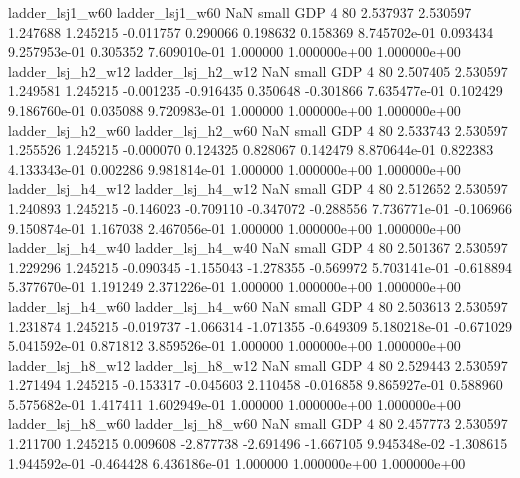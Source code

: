          ladder_lsj1_w60          ladder_lsj1_w60                   NaN      small      GDP                 4 80 2.537937       2.530597 1.247688       1.245215   -0.011757      0.290066      0.198632     0.158369   8.745702e-01  0.093434 9.257953e-01     0.305352   7.609010e-01            1.000000    1.000000e+00        1.000000e+00
       ladder_lsj_h2_w12        ladder_lsj_h2_w12                   NaN      small      GDP                 4 80 2.507405       2.530597 1.249581       1.245215   -0.001235     -0.916435      0.350648    -0.301866   7.635477e-01  0.102429 9.186760e-01     0.035088   9.720983e-01            1.000000    1.000000e+00        1.000000e+00
       ladder_lsj_h2_w60        ladder_lsj_h2_w60                   NaN      small      GDP                 4 80 2.533743       2.530597 1.255526       1.245215   -0.000070      0.124325      0.828067     0.142479   8.870644e-01  0.822383 4.133343e-01     0.002286   9.981814e-01            1.000000    1.000000e+00        1.000000e+00
       ladder_lsj_h4_w12        ladder_lsj_h4_w12                   NaN      small      GDP                 4 80 2.512652       2.530597 1.240893       1.245215   -0.146023     -0.709110     -0.347072    -0.288556   7.736771e-01 -0.106966 9.150874e-01     1.167038   2.467056e-01            1.000000    1.000000e+00        1.000000e+00
       ladder_lsj_h4_w40        ladder_lsj_h4_w40                   NaN      small      GDP                 4 80 2.501367       2.530597 1.229296       1.245215   -0.090345     -1.155043     -1.278355    -0.569972   5.703141e-01 -0.618894 5.377670e-01     1.191249   2.371226e-01            1.000000    1.000000e+00        1.000000e+00
       ladder_lsj_h4_w60        ladder_lsj_h4_w60                   NaN      small      GDP                 4 80 2.503613       2.530597 1.231874       1.245215   -0.019737     -1.066314     -1.071355    -0.649309   5.180218e-01 -0.671029 5.041592e-01     0.871812   3.859526e-01            1.000000    1.000000e+00        1.000000e+00
       ladder_lsj_h8_w12        ladder_lsj_h8_w12                   NaN      small      GDP                 4 80 2.529443       2.530597 1.271494       1.245215   -0.153317     -0.045603      2.110458    -0.016858   9.865927e-01  0.588960 5.575682e-01     1.417411   1.602949e-01            1.000000    1.000000e+00        1.000000e+00
       ladder_lsj_h8_w60        ladder_lsj_h8_w60                   NaN      small      GDP                 4 80 2.457773       2.530597 1.211700       1.245215    0.009608     -2.877738     -2.691496    -1.667105   9.945348e-02 -1.308615 1.944592e-01    -0.464428   6.436186e-01            1.000000    1.000000e+00        1.000000e+00
